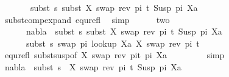 \begin{isabellebody}
\ \ \ \ \ \ \ subst\ s\ {\isacharparenleft}{\kern0pt}subst\ {\isacharbrackleft}{\kern0pt}{\isacharparenleft}{\kern0pt}X{\isacharcomma}{\kern0pt}\ swap\ {\isacharparenleft}{\kern0pt}rev\ pi{\isacharparenright}{\kern0pt}\ t{\isacharparenright}{\kern0pt}{\isacharbrackright}{\kern0pt}\ {\isacharparenleft}{\kern0pt}Susp\ pi\ Xa{\isacharparenright}{\kern0pt}{\isacharparenright}{\kern0pt}{\isachardoublequoteclose}\isanewline
\ \ \ \ \ \ \isamarkupfalse%
\ subst{\isacharunderscore}{\kern0pt}comp{\isacharunderscore}{\kern0pt}expand\ equ{\isacharunderscore}{\kern0pt}refl\ \isamarkupfalse%
\ simp\isanewline
\ \ \ \ \isamarkupfalse%
\ two{\isacharcolon}{\kern0pt}\ \isanewline
\ \ \ \ \ \ {\isachardoublequoteopen}nabla\ {\isasymturnstile}\ subst\ s\ {\isacharparenleft}{\kern0pt}subst\ {\isacharbrackleft}{\kern0pt}{\isacharparenleft}{\kern0pt}X{\isacharcomma}{\kern0pt}\ swap\ {\isacharparenleft}{\kern0pt}rev\ pi{\isacharparenright}{\kern0pt}\ t{\isacharparenright}{\kern0pt}{\isacharbrackright}{\kern0pt}\ {\isacharparenleft}{\kern0pt}Susp\ pi\ Xa{\isacharparenright}{\kern0pt}{\isacharparenright}{\kern0pt}\ {\isasymapprox}\ \isanewline
\ \ \ \ \ \ subst\ s\ {\isacharparenleft}{\kern0pt}swap\ pi\ {\isacharparenleft}{\kern0pt}look{\isacharunderscore}{\kern0pt}up\ Xa\ {\isacharbrackleft}{\kern0pt}{\isacharparenleft}{\kern0pt}X{\isacharcomma}{\kern0pt}\ swap\ {\isacharparenleft}{\kern0pt}rev\ pi{\isacharparenright}{\kern0pt}\ t{\isacharparenright}{\kern0pt}{\isacharbrackright}{\kern0pt}{\isacharparenright}{\kern0pt}{\isacharparenright}{\kern0pt}{\isachardoublequoteclose}\isanewline
\ \ \ \ \ \ \isamarkupfalse%
\ equ{\isacharunderscore}{\kern0pt}refl\ subst{\isacharunderscore}{\kern0pt}susp{\isacharbrackleft}{\kern0pt}of\ {\isacartoucheopen}{\isacharbrackleft}{\kern0pt}{\isacharparenleft}{\kern0pt}X{\isacharcomma}{\kern0pt}\ swap\ {\isacharparenleft}{\kern0pt}rev\ pi{\isacharparenright}{\kern0pt}t{\isacharparenright}{\kern0pt}{\isacharbrackright}{\kern0pt}{\isacartoucheclose}\ pi\ Xa{\isacharbrackright}{\kern0pt}\ \isanewline
\ \ \ \ \ \ \isamarkupfalse%
\ simp\isanewline
\ \ \ \ \isamarkupfalse%
\ {\isachardoublequoteopen}nabla\ {\isasymturnstile}\ subst\ {\isacharparenleft}{\kern0pt}s\ {\isasymbullet}\ {\isacharbrackleft}{\kern0pt}{\isacharparenleft}{\kern0pt}X{\isacharcomma}{\kern0pt}\ swap\ {\isacharparenleft}{\kern0pt}rev\ pi{\isacharparenright}{\kern0pt}\ t{\isacharparenright}{\kern0pt}{\isacharbrackright}{\kern0pt}{\isacharparenright}{\kern0pt}\ {\isacharparenleft}{\kern0pt}Susp\ pi\ Xa{\isacharparenright}{\kern0pt}\ {\isasymapprox}\ \isanewline

\end{isabellebody}
